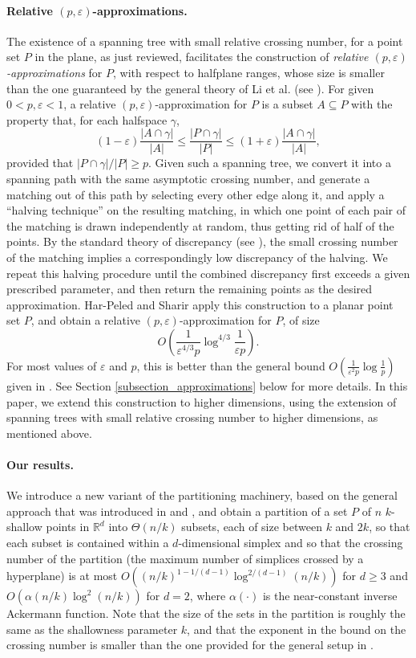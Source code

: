 \documentclass[11pt]{article}
\def\reals{\mathbb R}
\def\peps{(p,\varepsilon)}
\def\eps{\varepsilon}
\begin{document}
\paragraph{Relative $\peps$-approximations.} The existence of a spanning tree with small relative crossing number, for a point set $P$ in the plane, as just
reviewed, facilitates the construction of {\em relative $\peps$-approximations} for $P$, with respect to halfplane ranges, whose size is smaller than the
one guaranteed by the general theory of Li et al. \cite{lls01} (see \cite{hs11}). For given $0 < p,\eps < 1$, a relative $\peps$-approximation for $P$ is a
subset $A \subseteq P$ with the property that, for each halfspace $\gamma$,
$$
(1-\eps)\frac{|A \cap \gamma|}{|A|} \leq \frac{|P \cap \gamma|}{|P|} \leq
(1+\eps)\frac{|A \cap \gamma|}{|A|},
$$
provided that $|P \cap \gamma|/|P| \geq p$. Given such a spanning tree, we convert it into a spanning path with the same asymptotic crossing number, and
generate a matching out of this path by selecting every other edge along it, and apply a ``halving technique'' on the resulting matching, in which one point
of each pair of the matching is drawn independently at random, thus getting rid of half of the points. By the standard theory of discrepancy (see
\cite{cha01}), the small crossing number of the matching implies a correspondingly low discrepancy of the halving. We repeat this halving procedure until
the combined discrepancy first exceeds a given prescribed parameter, and then return the remaining points as the desired approximation. Har-Peled and Sharir
\cite{hs11} apply this construction to a planar point set $P$, and obtain a relative $\peps$-approximation for $P$, of size
$$
O\left(\frac{1}{\eps^{4/3}p}\log^{4/3}\frac{1}{\eps p}\right).
$$
For most values of $\eps$ and $p$, this is better than the general bound $O(\tfrac{1}{\eps^{2}p}\log\tfrac{1}{p})$ given in \cite{lls01}. See Section \ref{subsection_approximations} below for more details. In this paper, we extend this construction to higher dimensions, using the extension of spanning trees with small relative crossing number to higher dimensions, as mentioned above.


\paragraph{Our results.} We introduce a new variant of the partitioning machinery, based on the general approach that was introduced in \cite{mat92a} and
\cite{mat92b}, and obtain a partition of a set $P$ of $n$ $k$-shallow points in $\reals^{d}$ into $\Theta(n/k)$ subsets, each of size between $k$ and $2k$,
so that each subset is contained within a $d$-dimensional simplex and so that the crossing number of the partition (the maximum number of simplices crossed
by a hyperplane) is at most $O((n/k)^{1-1/(d-1)} \log^{2/(d-1)}(n/k))$ for $d \geq 3$ and $O(\alpha(n/k)\log^{2}(n/k))$ for $d = 2$, where $\alpha(\cdot)$
is the near-constant inverse Ackermann function. Note that the size of the sets in the partition is roughly the same as the shallowness parameter $k$, and
that the exponent in the bound on the crossing number is smaller than the one provided for the general setup in \cite{mat92a}.
\end{document}
